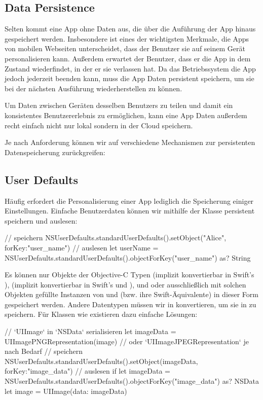 \documentclass[parskip=half, final]{scrreprt}
\begin{document}
\begin{lecture}

\section{Data Persistence}

Selten kommt eine App ohne Daten aus, die über die Auführung der App hinaus gespeichert werden. Insbesondere ist eines der wichtigsten Merkmale, die Apps von mobilen Webseiten unterscheidet, dass der Benutzer sie auf seinem Gerät personalisieren kann. Außerdem erwartet der Benutzer, dass er die App in dem Zustand wiederfindet, in der er sie verlassen hat. Da das Betriebssystem die App jedoch jederzeit beenden kann, muss die App Daten persistent speichern, um sie bei der nächsten Ausführung wiederherstellen zu können.

Um Daten zwischen Geräten desselben Benutzers zu teilen und damit ein konsistentes Benutzererlebnis zu ermöglichen, kann eine App Daten außerdem recht einfach nicht nur lokal sondern in der Cloud speichern.

Je nach Anforderung können wir auf verschiedene Mechanismen zur persistenten Datenspeicherung zurückgreifen:

\subsection{User Defaults}\label{sec:userdefaults}

Häufig erfordert die Personalisierung einer App lediglich die Speicherung einiger Einstellungen. Einfache Benutzerdaten können wir mithilfe der  Klasse persistent speichern und auslesen:

\begin{swiftcode}
// speichern
NSUserDefaults.standardUserDefaults().setObject("Alice", forKey:"user_name")
// auslesen
let userName = NSUserDefaults.standardUserDefaults().objectForKey("user_name") as? String
\end{swiftcode}

Es können nur Objekte der Objective-C Typen  (implizit konvertierbar in Swift's ),  (implizit konvertierbar in Swift's  und ),  und  oder ausschließlich mit solchen Objekten gefüllte Instanzen von  und  (bzw. ihre Swift-Äquivalente) in dieser Form gespeichert werden. Andere Datentypen müssen wir in  konvertieren, um sie in  zu speichern. Für Klassen wie  existieren dazu einfache Lösungen:
\begin{swiftcode}
// `UIImage` in `NSData` serialisieren
let imageData = UIImagePNGRepresentation(image) // oder `UIImageJPEGRepresentation` je nach Bedarf
// speichern
NSUserDefaults.standardUserDefaults().setObject(imageData, forKey:"image_data")
// auslesen
if let imageData = NSUserDefaults.standardUserDefaults().objectForKey("image_data") as? NSData {
    let image = UIImage(data: imageData)
}
\end{swiftcode}


\end{lecture}
\end{document}

